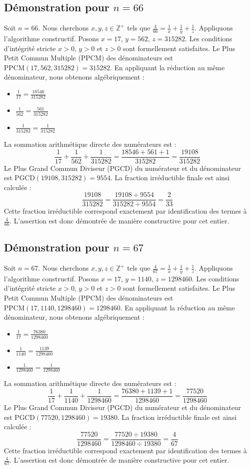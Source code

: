 \documentclass[11pt,a4paper]{article}
\begin{document}
\subsection{Démonstration pour $n = 66$}
Soit $n = 66$. Nous cherchons $x, y, z \in \mathbb{Z}^{+}$ tels que $\frac{4}{66} = \frac{1}{x} + \frac{1}{y} + \frac{1}{z}$.
Appliquons l'algorithme constructif. Posons $x = 17$, $y = 562$, $z = 315282$.
Les conditions d'intégrité stricte $x > 0$, $y > 0$ et $z > 0$ sont formellement satisfaites.
Le Plus Petit Commun Multiple (PPCM) des dénominateurs est $\text{PPCM}(17, 562, 315282) = 315282$.
En appliquant la réduction au même dénominateur, nous obtenons algébriquement :
\begin{itemize}
    \item $\frac{1}{17} = \frac{18546}{315282}$
    \item $\frac{1}{562} = \frac{561}{315282}$
    \item $\frac{1}{315282} = \frac{1}{315282}$
\end{itemize}
La sommation arithmétique directe des numérateurs est :
$$ \frac{1}{17} + \frac{1}{562} + \frac{1}{315282} = \frac{18546 + 561 + 1}{315282} = \frac{19108}{315282} $$
Le Plus Grand Commun Diviseur (PGCD) du numérateur et du dénominateur est $\text{PGCD}(19108, 315282) = 9554$.
La fraction irréductible finale est ainsi calculée :
$$ \frac{19108}{315282} = \frac{19108 \div 9554}{315282 \div 9554} = \frac{2}{33} $$
Cette fraction irréductible correspond exactement par identification des termes à $\frac{4}{66}$. L'assertion est donc démontrée de manière constructive pour cet entier.

\subsection{Démonstration pour $n = 67$}
Soit $n = 67$. Nous cherchons $x, y, z \in \mathbb{Z}^{+}$ tels que $\frac{4}{67} = \frac{1}{x} + \frac{1}{y} + \frac{1}{z}$.
Appliquons l'algorithme constructif. Posons $x = 17$, $y = 1140$, $z = 1298460$.
Les conditions d'intégrité stricte $x > 0$, $y > 0$ et $z > 0$ sont formellement satisfaites.
Le Plus Petit Commun Multiple (PPCM) des dénominateurs est $\text{PPCM}(17, 1140, 1298460) = 1298460$.
En appliquant la réduction au même dénominateur, nous obtenons algébriquement :
\begin{itemize}
    \item $\frac{1}{17} = \frac{76380}{1298460}$
    \item $\frac{1}{1140} = \frac{1139}{1298460}$
    \item $\frac{1}{1298460} = \frac{1}{1298460}$
\end{itemize}
La sommation arithmétique directe des numérateurs est :
$$ \frac{1}{17} + \frac{1}{1140} + \frac{1}{1298460} = \frac{76380 + 1139 + 1}{1298460} = \frac{77520}{1298460} $$
Le Plus Grand Commun Diviseur (PGCD) du numérateur et du dénominateur est $\text{PGCD}(77520, 1298460) = 19380$.
La fraction irréductible finale est ainsi calculée :
$$ \frac{77520}{1298460} = \frac{77520 \div 19380}{1298460 \div 19380} = \frac{4}{67} $$
Cette fraction irréductible correspond exactement par identification des termes à $\frac{4}{67}$. L'assertion est donc démontrée de manière constructive pour cet entier.
\end{document}
